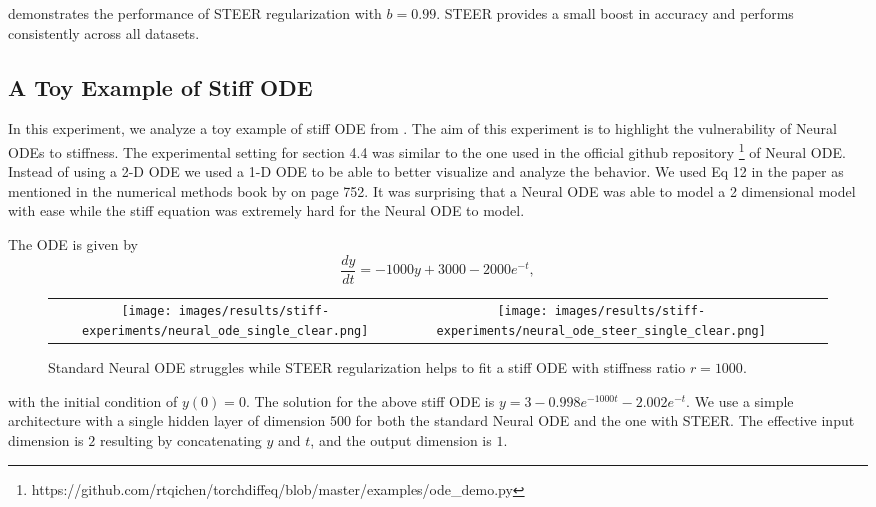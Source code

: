  demonstrates the performance of STEER regularization with $b=0.99$. STEER provides a small boost in accuracy and performs consistently across all datasets. 



\subsection{A Toy Example of Stiff ODE}

In this experiment, we analyze a toy example of stiff ODE from \cite{chapra2010numerical}. The aim of this experiment is to highlight the vulnerability of Neural ODEs to stiffness. The experimental setting for section 4.4 was similar to the one used in the official github repository \footnote{https://github.com/rtqichen/torchdiffeq/blob/master/examples/ode\_demo.py} of Neural ODE. Instead of using a 2-D ODE we used a 1-D ODE to be able to better visualize and analyze the behavior. We used Eq 12 in the paper as mentioned in the numerical methods book by \cite{chapra2010numerical} on page 752. It was surprising that a Neural ODE was able to model a 2 dimensional model with ease while the stiff equation was extremely hard for the Neural ODE to model.

The ODE is given by 
\begin{equation}
	\frac{dy}{dt}= -1000y + 3000 - 2000e^{-t},
	\label{eq:stiff}
\end{equation}



\begin{wrapfigure}[12]{r}{0.55\textwidth}
	\vspace{-0.1in}
	\centering
	\begin{tabular}{*{4}{c@{\hspace{3px}}}}
		\texttt{[image: images/results/stiff-experiments/neural\_ode\_single\_clear.png]} &
		\texttt{[image: images/results/stiff-experiments/neural\_ode\_steer\_single\_clear.png]}
		\\
	\end{tabular}
	\caption{Standard Neural ODE struggles while STEER regularization helps to fit a stiff ODE with stiffness ratio $r=1000$.}
	\label{fig:toy_steer}
\end{wrapfigure}

with the initial condition of $y(0)=0$. 
The solution for the above stiff ODE is  $y = 3 - 0.998e^{-1000t} -2.002 e^{-t}$.
We use a simple architecture with a single hidden layer of dimension $500$ for both the standard Neural ODE and the one with STEER. The effective input dimension is $2$ resulting by concatenating $y$ and $t$, and the output dimension is $1$. 


